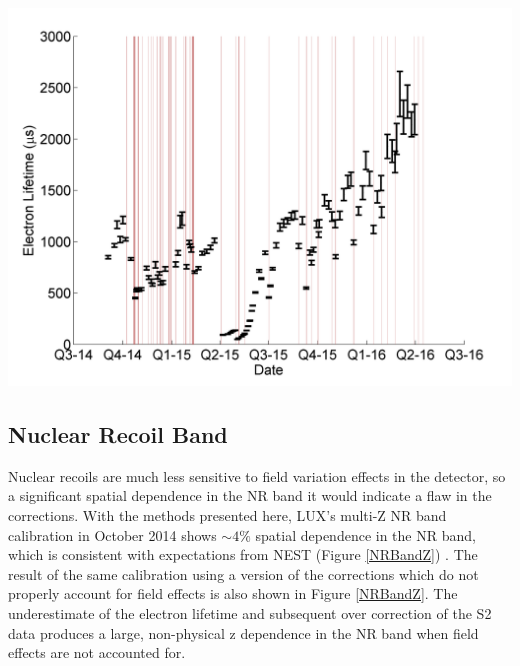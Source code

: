 \documentclass[a4paper,10pt,twocolumn]{article}
\begin{document}
\begin{center}
\includegraphics[scale=0.4]{Run04Corrections/LUX_eLifetime_Kr2p22.png}
 \label{fig:KrypCalLifetime}
\end{center}

\subsection{Nuclear Recoil Band}

Nuclear recoils are much less sensitive to field variation effects in the detector, so a significant spatial dependence in the NR band it would indicate a flaw in the corrections. With the methods presented here, LUX's multi-Z NR band calibration in October 2014 shows $\sim4\%$ spatial dependence in the NR band, which is consistent with expectations from NEST (Figure \ref{NRBandZ}) . The result of the same calibration using a version of the corrections which do not properly account for field effects is also shown in Figure \ref{NRBandZ}.  The underestimate of the electron lifetime and subsequent over correction of the S2 data produces a large, non-physical z dependence in the NR band when field effects are not accounted for.  
\end{document}
